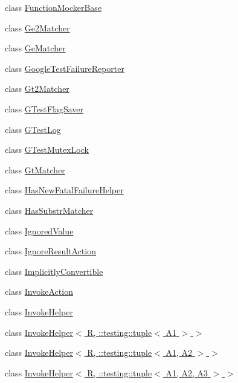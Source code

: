 \begin{DoxyCompactItemize}
\item 
class \hyperlink{classtesting_1_1internal_1_1_function_mocker_base}{Function\+Mocker\+Base}
\item 
class \hyperlink{classtesting_1_1internal_1_1_ge2_matcher}{Ge2\+Matcher}
\item 
class \hyperlink{classtesting_1_1internal_1_1_ge_matcher}{Ge\+Matcher}
\item 
class \hyperlink{classtesting_1_1internal_1_1_google_test_failure_reporter}{Google\+Test\+Failure\+Reporter}
\item 
class \hyperlink{classtesting_1_1internal_1_1_gt2_matcher}{Gt2\+Matcher}
\item 
class \hyperlink{classtesting_1_1internal_1_1_g_test_flag_saver}{G\+Test\+Flag\+Saver}
\item 
class \hyperlink{classtesting_1_1internal_1_1_g_test_log}{G\+Test\+Log}
\item 
class \hyperlink{classtesting_1_1internal_1_1_g_test_mutex_lock}{G\+Test\+Mutex\+Lock}
\item 
class \hyperlink{classtesting_1_1internal_1_1_gt_matcher}{Gt\+Matcher}
\item 
class \hyperlink{classtesting_1_1internal_1_1_has_new_fatal_failure_helper}{Has\+New\+Fatal\+Failure\+Helper}
\item 
class \hyperlink{classtesting_1_1internal_1_1_has_substr_matcher}{Has\+Substr\+Matcher}
\item 
class \hyperlink{classtesting_1_1internal_1_1_ignored_value}{Ignored\+Value}
\item 
class \hyperlink{classtesting_1_1internal_1_1_ignore_result_action}{Ignore\+Result\+Action}
\item 
class \hyperlink{classtesting_1_1internal_1_1_implicitly_convertible}{Implicitly\+Convertible}
\item 
class \hyperlink{classtesting_1_1internal_1_1_invoke_action}{Invoke\+Action}
\item 
class \hyperlink{classtesting_1_1internal_1_1_invoke_helper}{Invoke\+Helper}
\item 
class \hyperlink{classtesting_1_1internal_1_1_invoke_helper_3_01_r_00_01_1_1testing_1_1tuple_3_01_a1_01_4_01_4}{Invoke\+Helper$<$ R, \+::testing\+::tuple$<$ A1 $>$ $>$}
\item 
class \hyperlink{classtesting_1_1internal_1_1_invoke_helper_3_01_r_00_01_1_1testing_1_1tuple_3_01_a1_00_01_a2_01_4_01_4}{Invoke\+Helper$<$ R, \+::testing\+::tuple$<$ A1, A2 $>$ $>$}
\item 
class \hyperlink{classtesting_1_1internal_1_1_invoke_helper_3_01_r_00_01_1_1testing_1_1tuple_3_01_a1_00_01_a2_00_01_a3_01_4_01_4}{Invoke\+Helper$<$ R, \+::testing\+::tuple$<$ A1, A2, A3 $>$ $>$}

\end{DoxyCompactItemize}
